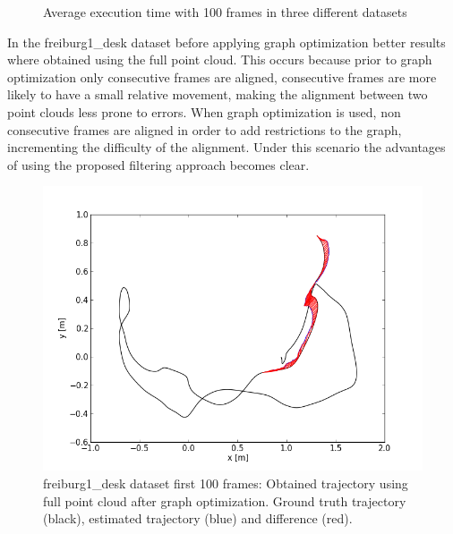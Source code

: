 \begin{center}
\begin{figure}
\caption{Average execution time with 100 frames in three different datasets} 
\end{figure}
\end{center}

In the freiburg1\_desk dataset before applying graph optimization better results where obtained using 
the full point cloud. This occurs because prior to graph optimization only consecutive frames are aligned, 
consecutive frames are more likely to have a small relative movement, making the alignment between two point clouds 
less prone to 
errors. When graph optimization is used, non consecutive frames are aligned in order to add restrictions to the graph, 
incrementing the difficulty of 
the alignment. Under this scenario the advantages of using the proposed filtering approach becomes clear.


\begin{figure}[H]
\begin{center}
\includegraphics[scale=0.75]{images/freiburg1_desk_1_100_fullcloud_optimized.png}
\caption{freiburg1\_desk dataset first 100 frames: Obtained trajectory using full point cloud after graph optimization. Ground truth trajectory (black), estimated trajectory (blue) and difference (red).}
\label{fig:jan}
\end{center}
\end{figure}

